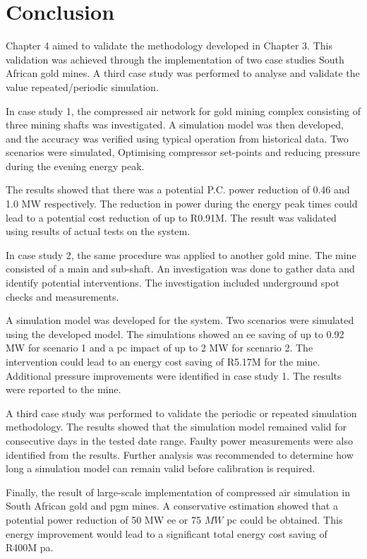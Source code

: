 \section{Conclusion}
Chapter 4 aimed to validate the methodology developed in Chapter 3. This validation was achieved through the implementation of two case studies South African gold mines. A third case study was performed to analyse and validate the value repeated/periodic simulation.
\par 
In case study 1, the compressed air network for gold mining complex consisting of three mining shafts was investigated. A simulation model was then developed, and the accuracy was verified using typical operation from historical data. Two scenarios were simulated, Optimising compressor set-points and reducing pressure during the evening energy peak.
\par 
The results showed that there was a potential P.C. power reduction of 0.46 and 1.0 MW respectively. The reduction in power during the energy peak times could lead to a potential cost reduction of up to R0.91M. The result was validated using results of actual tests on the system.
\par
In case study 2, the same procedure was applied to another gold mine.  The mine consisted of a main and sub-shaft. An investigation was done to gather data and identify potential interventions. The investigation included underground spot checks and measurements.
\par 
A simulation model was developed for the system. Two scenarios were simulated using the developed model. The simulations showed an \gls{ee} saving of up to 0.92 MW for scenario 1 and a \gls{pc} impact of up to 2 MW for scenario 2. The intervention could lead to an energy cost saving of R5.17M for the mine. Additional pressure improvements were identified in case study 1. The results were reported to the mine.
\par
A third case study was performed to validate the periodic or repeated simulation methodology. The results showed that the simulation model remained valid for consecutive days in the tested date range. Faulty power measurements were also identified from the results. Further analysis was recommended to determine how long a simulation model can remain valid before calibration is required.
\par 
Finally, the result of large-scale implementation of compressed air simulation in South African gold and \gls{pgm} mines. A conservative estimation showed that a potential power reduction of 50 MW \gls{ee} or 75 $ MW $ \gls{pc} could be obtained. This energy improvement would lead to a significant total energy cost saving of R400M \gls{pa}.
